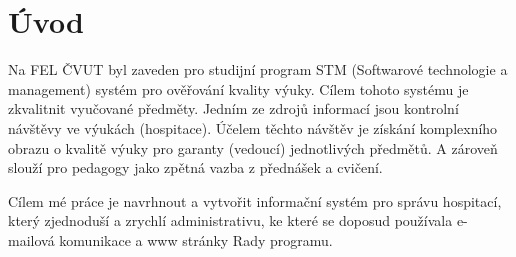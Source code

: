 \chapter{Úvod}

Na FEL ČVUT byl zaveden pro studijní program STM (Softwarové technologie a management) systém pro ověřování kvality výuky. Cílem tohoto systému je zkvalitnit vyučované předměty. Jedním ze zdrojů informací jsou kontrolní návštěvy ve výukách (hospitace). Účelem těchto návštěv je získání komplexního obrazu o kvalitě výuky pro garanty (vedoucí) jednotlivých předmětů. A zároveň slouží pro pedagogy jako zpětná vazba z přednášek a cvičení.

Cílem mé práce je navrhnout a vytvořit informační systém pro správu hospitací, který zjednoduší a zrychlí administrativu, ke které se doposud používala e-mailová komunikace a www stránky Rady programu. 